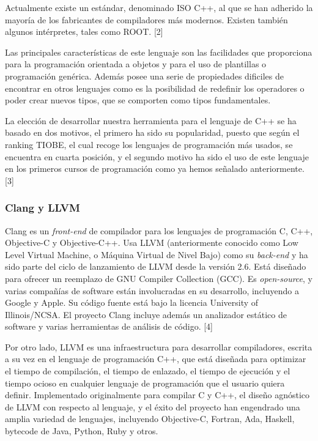 Actualmente existe un est\'andar, denominado ISO C++, al que se han adherido la mayor\'ia de los fabricantes de compiladores m\'as modernos. Existen tambi\'en algunos int\'erpretes, tales como ROOT. [2]

Las principales caracter\'isticas de este lenguaje son las facilidades que proporciona para la programaci\'on orientada a objetos y para el uso de plantillas o programaci\'on gen\'erica. Adem\'as posee una serie de propiedades dificiles de encontrar en otros lenguajes como es la posibilidad de redefinir los operadores o poder crear nuevos tipos, que se comporten como tipos fundamentales.

La elecci\'on de desarrollar nuestra herramienta para el lenguaje de C++ se ha basado en dos motivos, el primero ha sido su popularidad, puesto que seg\'un el ranking TIOBE, el cual recoge los lenguajes de programaci\'on m\'as usados, se encuentra en cuarta posici\'on, y el segundo motivo ha sido el uso de este lenguaje en los primeros cursos de programaci\'on como ya hemos se\~nalado anteriormente. [3]

\subsubsection*{Clang y LLVM}

Clang es un {\it front-end} de compilador para los lenguajes de programaci\'on C, C++, Objective-C y Objective-C++. Usa LLVM (anteriormente conocido como Low Level Virtual Machine, o M\'aquina Virtual de Nivel Bajo) como su {\it back-end} y ha sido parte del ciclo de lanzamiento de LLVM desde la versi\'on 2.6. Est\'a dise\~nado para ofrecer un reemplazo de GNU Compiler Collection (GCC). Es {\it open-source}, y varias compa\~n\'ias de software est\'an involucradas en su desarrollo, incluyendo a Google y Apple. Su c\'odigo fuente est\'a bajo la licencia University of Illinois/NCSA. El proyecto Clang incluye adem\'as un analizador est\'atico de software y varias herramientas de an\'alisis de c\'odigo. [4]

Por otro lado, LLVM es una infraestructura para desarrollar compiladores, escrita a su vez en el lenguaje de programaci\'on C++, que est\'a dise\~nada para optimizar el tiempo de compilaci\'on, el tiempo de enlazado, el tiempo de ejecuci\'on y el tiempo ocioso en cualquier lenguaje de programaci\'on que el usuario quiera definir. Implementado originalmente para compilar C y C++, el dise\~no agn\'ostico de LLVM con respecto al lenguaje, y el \'exito del proyecto han engendrado una amplia variedad de lenguajes, incluyendo Objective-C, Fortran, Ada, Haskell, bytecode de Java, Python, Ruby y otros.

